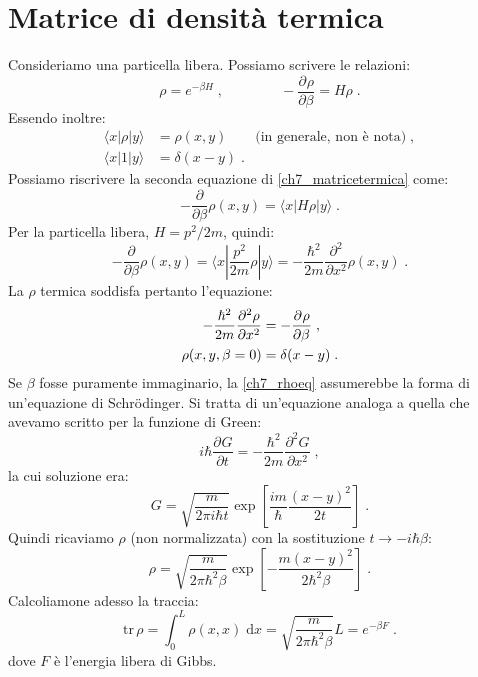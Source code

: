 \documentclass[12pt,a4paper]{report}
\theoremstyle{definition}
\newcommand{\pdev}[3][]{\frac{\partial^{#1} #2}{\partial #3^{#1}}}
\numberwithin{equation}{section}
\newcommand{\diff}[1][]{\mathrm{d}#1}
\newcommand{\bra}{\langle}
\newcommand{\ket}{\rangle}
\newcommand{\Sch}{Schrödinger}
\newcommand{\tr}{\mathrm{tr}}
\begin{document}
\section{Matrice di densità termica}
Consideriamo una particella libera. Possiamo scrivere le relazioni:
\begin{equation}
\rho=e^{-\beta H}\;, \qquad \qquad -\pdev{\rho}{\beta}=H\rho\;. \label{ch7_matricetermica}
\end{equation}
Essendo inoltre:
\begin{align*}
\bra x|\rho|y\ket &= \rho(x,y)\qquad\mbox{(in generale, non è nota)}\;, \\
\bra x|1|y\ket &= \delta(x-y)\;.
\end{align*}
Possiamo riscrivere la seconda equazione di \eqref{ch7_matricetermica} come:
\begin{equation}
-\frac{\partial}{\partial\beta}\rho(x,y)=\bra x|H\rho|y\ket\;.
\end{equation}
Per la particella libera, $H=p^2/2m$, quindi:
\begin{equation}
-\frac{\partial}{\partial\beta}\rho(x,y)=\bra x|\frac{p^2}{2m}\rho|y\ket=-\frac{\hbar^2}{2m}\frac{\partial^2}{\partial x^2}\rho(x,y)\;.
\end{equation}
La $\rho$ termica soddisfa pertanto l'equazione:
\begin{align}
-\frac{\hbar^2}{2m}\pdev[2]{\rho}{x} &= -\pdev{\rho}{\beta}\;, \notag \\
\rho(x,y,\beta=0)&=\delta(x-y)\;. \label{ch7_rhoeq}
\end{align}
Se $\beta$ fosse puramente immaginario, la \eqref{ch7_rhoeq} assumerebbe la forma di un'equazione di \Sch. Si tratta di un'equazione analoga a quella che avevamo scritto per la funzione di Green:
\begin{equation}
i\hbar\pdev{G}{t}=-\frac{\hbar^2}{2m}\pdev[2]{G}{x}\;,
\end{equation}
la cui soluzione era:
\begin{equation}
G=\sqrt{\frac{m}{2\pi i\hbar t}}\exp\left[\frac{im}{\hbar}\frac{(x-y)^2}{2t}\right]\;.
\end{equation}
Quindi ricaviamo $\rho$ (non normalizzata) con la sostituzione $t\to -i\hbar\beta$:
\begin{equation}
\rho=\sqrt{\frac{m}{2\pi\hbar^2\beta}}\exp\left[-\frac{m(x-y)^2}{2\hbar^2\beta}\right]\;.
\end{equation}
Calcoliamone adesso la traccia:
\begin{equation}
\tr\,\rho=\int_0^L \rho(x,x)\;\diff{x}=\sqrt{\frac{m}{2\pi\hbar^2\beta}}L=e^{-\beta F}\;.
\end{equation}
dove $F$ è l'energia libera di Gibbs.
\end{document}
